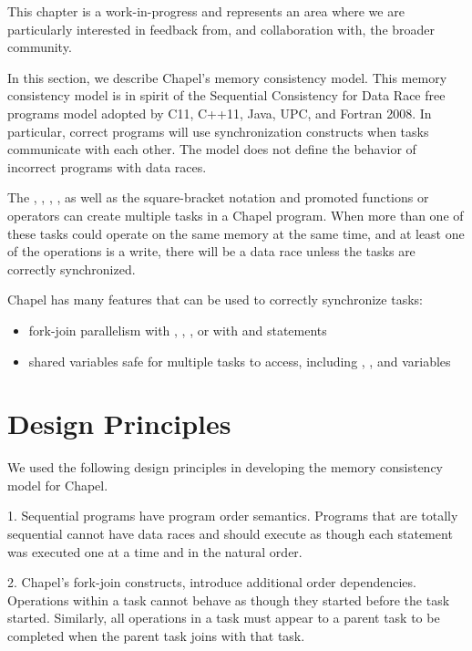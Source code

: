 \label{Memory_Consistency_Model}

\begin{openissue}
  This chapter is a work-in-progress and represents an area where we
  are particularly interested in feedback from, and collaboration
  with, the broader community.
\end{openissue}

In this section, we describe Chapel's memory consistency model. This memory
consistency model is in spirit of the Sequential Consistency for Data Race free
programs model adopted by C11, C++11, Java, UPC, and Fortran 2008. In
particular, correct programs will use synchronization constructs when tasks
communicate with each other. The model does not define the behavior of
incorrect programs with data races.

The , , , , as well as
the square-bracket notation and promoted functions or operators can create
multiple tasks in a Chapel program. When more than one of these tasks could
operate on the same memory at the same time, and at least one of the operations
is a write, there will be a data race unless the tasks are correctly
synchronized.

Chapel has many features that can be used to correctly synchronize tasks:
\begin{itemize}
  \item fork-join parallelism with , , , or with  and  statements
  \item shared variables safe for multiple tasks to access, including , , and  variables
\end{itemize}

\section{Design Principles}

We used the following design principles in developing the memory consistency
model for Chapel.

1. Sequential programs have program order semantics. Programs that are totally
   sequential cannot have data races and should execute as though each statement
   was executed one at a time and in the natural order.

2. Chapel's fork-join constructs, introduce additional order dependencies.
   Operations within a task cannot behave as though they started before the
   task started. Similarly, all operations in a task must appear to a parent
   task to be completed when the parent task joins with that task.

